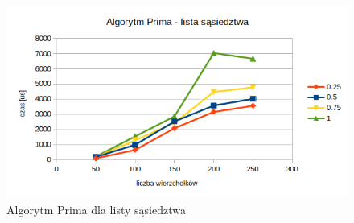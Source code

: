 \documentclass[11pt]{article}
\begin{document}
\begin{figure}[H]
    \includegraphics[width=13cm]{images/primlista.png}
    \caption{ Algorytm Prima dla listy sąsiedztwa}
\end{figure}
\end{document}
